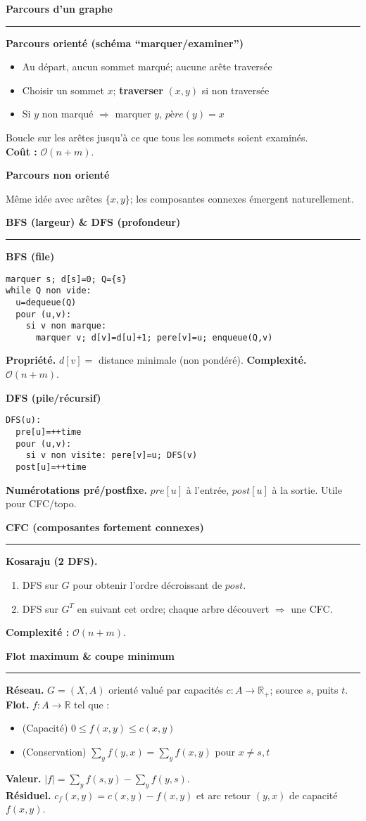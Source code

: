 \documentclass[9pt,a4paper]{article}
\newcommand{\bigO}{\mathcal{O}}
\newcommand{\sect}[1]{\vspace{1ex}\textbf{\large #1}\par\vspace{0.3ex}\hrule\vspace{0.6ex}}
\newcommand{\subsect}[1]{\vspace{0.4ex}\textbf{#1}\par}
\begin{document}
\begin{multicols}{3}
    \sect{Parcours d'un graphe}
    \subsect{Parcours orienté (schéma ``marquer/examiner'')}
    \begin{itemize}
        \item Au départ, aucun sommet marqué; aucune arête traversée
        \item Choisir un sommet $x$; \textbf{traverser} $(x,y)$ si non traversée
        \item Si $y$ non marqué $\Rightarrow$ marquer $y$, $père(y)=x$
    \end{itemize}
    Boucle sur les arêtes jusqu'à ce que tous les sommets soient examinés.\\
    \textbf{Coût :} $\bigO(n+m)$.

    \subsect{Parcours non orienté}
    Même idée avec arêtes $\{x,y\}$; les composantes connexes émergent naturellement.

    \sect{BFS (largeur) \& DFS (profondeur)}
    \subsect{BFS (file)}
    \begin{lstlisting}[style=tight]
marquer s; d[s]=0; Q={s}
while Q non vide:
  u=dequeue(Q)
  pour (u,v):
    si v non marque:
      marquer v; d[v]=d[u]+1; pere[v]=u; enqueue(Q,v)
\end{lstlisting}
    \textbf{Propriété.} $d[v]=$ distance minimale (non pondéré). \quad \textbf{Complexité.} $\bigO(n+m)$.

    \subsect{DFS (pile/récursif)}
    \begin{lstlisting}[style=tight]
DFS(u):
  pre[u]=++time
  pour (u,v):
    si v non visite: pere[v]=u; DFS(v)
  post[u]=++time
\end{lstlisting}
    \textbf{Numérotations pré/postfixe.} $pre[u]$ à l'entrée, $post[u]$ à la sortie. Utile pour CFC/topo.

    \sect{CFC (composantes fortement connexes)}
    \textbf{Kosaraju (2 DFS).}
    \begin{enumerate}
        \item DFS sur $G$ pour obtenir l'ordre décroissant de $post$.
        \item DFS sur $G^{T}$ en suivant cet ordre; chaque arbre découvert $\Rightarrow$ une CFC.
    \end{enumerate}
    \textbf{Complexité :} $\bigO(n+m)$.

    \sect{Flot maximum \& coupe minimum}
    \textbf{Réseau.} $G=(X,A)$ orienté valué par capacités $c:A\to\mathbb{R}_+$; source $s$, puits $t$.\\
    \textbf{Flot.} $f:A\to\mathbb{R}$ tel que :
    \begin{itemize}
        \item (Capacité) $0\le f(x,y)\le c(x,y)$
        \item (Conservation) $\sum_y f(y,x)=\sum_y f(x,y)$ pour $x\neq s,t$
    \end{itemize}
    \textbf{Valeur.} $|f|=\sum_y f(s,y)-\sum_y f(y,s)$.\\
    \textbf{Résiduel.} $c_f(x,y)=c(x,y)-f(x,y)$ et arc retour $(y,x)$ de capacité $f(x,y)$.


\end{multicols}
\end{document}
